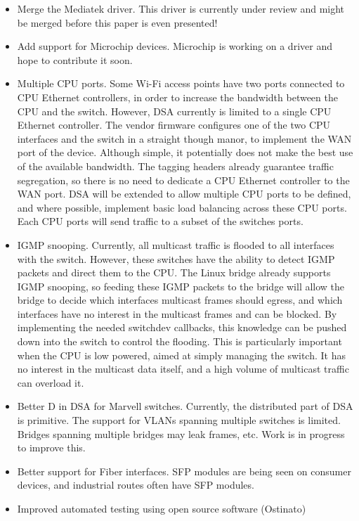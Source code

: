 \documentclass[letterpaper]{article}
\begin{document}
\begin{itemize}
\item Merge the Mediatek driver. This driver is currently under review
  and might be merged before this paper is even presented!
\item Add support for Microchip devices. Microchip is working on a
  driver and hope to contribute it soon.
\item Multiple CPU ports. Some Wi-Fi access points have two ports
  connected to CPU Ethernet controllers, in order to increase the
  bandwidth between the CPU and the switch. However, DSA currently is
  limited to a single CPU Ethernet controller. The vendor firmware
  configures one of the two CPU interfaces and the switch in a
  straight though manor, to implement the WAN port of the
  device. Although simple, it potentially does not make the best use
  of the available bandwidth. The tagging headers already guarantee
  traffic segregation, so there is no need to dedicate a CPU Ethernet
  controller to the WAN port. DSA will be extended to allow multiple
  CPU ports to be defined, and where possible, implement basic load
  balancing across these CPU ports. Each CPU ports will send traffic
  to a subset of the switches ports.
\item IGMP snooping. Currently, all multicast traffic is flooded to
  all interfaces with the switch. However, these switches have the
  ability to detect IGMP packets and direct them to the CPU. The Linux
  bridge already supports IGMP snooping, so feeding these IGMP packets
  to the bridge will allow the bridge to decide which interfaces
  multicast frames should egress, and which interfaces have no
  interest in the multicast frames and can be blocked. By implementing
  the needed switchdev callbacks, this knowledge can be pushed down
  into the switch to control the flooding. This is particularly
  important when the CPU is low powered, aimed at simply managing the
  switch. It has no interest in the multicast data itself, and a high
  volume of multicast traffic can overload it.
\item Better D in DSA for Marvell switches. Currently, the distributed
  part of DSA is primitive. The support for VLANs spanning multiple
  switches is limited. Bridges spanning multiple bridges may leak
  frames, etc. Work is in progress to improve this.
\item Better support for Fiber interfaces. SFP modules are being seen
  on consumer devices, and industrial routes often have SFP modules.
\item Improved automated testing using open source software (Ostinato)
\end{itemize}
\end{document}
